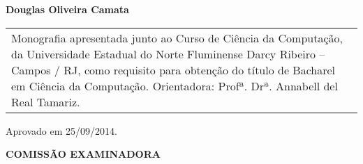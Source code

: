 \begin{folhadeaprovacao}
  \thispagestyle{empty}
  \center
  \textbf{Douglas Oliveira Camata}
  \vfill

  \center{\textbf{\Large{\textit{\meutitulo}}}}

  \hspace*{2cm}
  \begin{table}[h!]
    \raggedleft
    \begin{tabular}{p{7cm}}
    Monografia apresentada junto ao Curso de Ciência da Computação, da Universidade Estadual do Norte Fluminense Darcy Ribeiro – Campos / RJ, como requisito para obtenção do título de Bacharel em Ciência da Computação.
    Orientadora: Profª. Drª. Annabell del Real Tamariz.
    \end{tabular}
  \end{table}

  \hspace*{2cm}
  \raggedright Aprovado em 25/09/2014.

  \center
  \textbf{COMISSÃO EXAMINADORA}

  \setlength{\ABNTsignthickness}{0.4pt} \setlength{\ABNTsignskip}{1.7cm}

\end{folhadeaprovacao}
